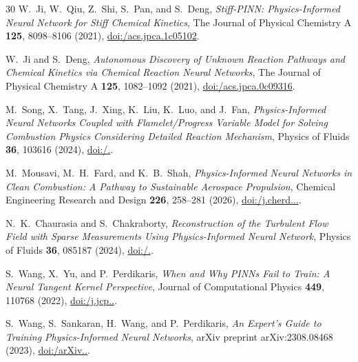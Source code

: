 \documentclass[reprint,aps,prfluids,superscriptaddress,twocolumn,floatfix]{revtex4-2}
\begin{document}
\begin{thebibliography}{30}
 W.~Ji, W.~Qiu, Z.~Shi, S.~Pan, and S.~Deng, \textit{Stiff-PINN: Physics-Informed Neural Network for Stiff Chemical Kinetics}, The Journal of Physical Chemistry A \textbf{125}, 8098--8106 (2021), \href{https://doi.org/10.1021/acs.jpca.1c05102}{doi:/\allowbreak acs.\allowbreak jpca.\allowbreak 1c05102}.

 W.~Ji and S.~Deng, \textit{Autonomous Discovery of Unknown Reaction Pathways and Chemical Kinetics via Chemical Reaction Neural Networks}, The Journal of Physical Chemistry A \textbf{125}, 1082--1092 (2021), \href{https://doi.org/10.1021/acs.jpca.0c09316}{doi:/\allowbreak acs.\allowbreak jpca.\allowbreak 0c09316}.

 M.~Song, X.~Tang, J.~Xing, K.~Liu, K.~Luo, and J.~Fan, \textit{Physics-Informed Neural Networks Coupled with Flamelet/Progress Variable Model for Solving Combustion Physics Considering Detailed Reaction Mechanism}, Physics of Fluids \textbf{36}, 103616 (2024), \href{https://doi.org/10.1063/5.0227581}{doi:/.}.

 M.~Mousavi, M.~H.~Fard, and K.~B.~Shah, \textit{Physics-Informed Neural Networks in Clean Combustion: A Pathway to Sustainable Aerospace Propulsion}, Chemical Engineering Research and Design \textbf{226}, 258--281 (2026), \href{https://doi.org/10.1016/j.cherd.2026.01.008}{doi:/\allowbreak j.\allowbreak cherd...}.

 N.~K.~Chaurasia and S.~Chakraborty, \textit{Reconstruction of the Turbulent Flow Field with Sparse Measurements Using Physics-Informed Neural Network}, Physics of Fluids \textbf{36}, 085187 (2024), \href{https://doi.org/10.1063/5.0218611}{doi:/.}.

 S.~Wang, X.~Yu, and P.~Perdikaris, \textit{When and Why PINNs Fail to Train: A Neural Tangent Kernel Perspective}, Journal of Computational Physics \textbf{449}, 110768 (2022), \href{https://doi.org/10.1016/j.jcp.2021.110768}{doi:/\allowbreak j.\allowbreak jcp..}.

 S.~Wang, S.~Sankaran, H.~Wang, and P.~Perdikaris, \textit{An Expert's Guide to Training Physics-Informed Neural Networks}, arXiv preprint arXiv:2308.08468 (2023), \href{https://doi.org/10.48550/arXiv.2308.08468}{doi:/\allowbreak arXiv..}.


\end{thebibliography}
\end{document}
